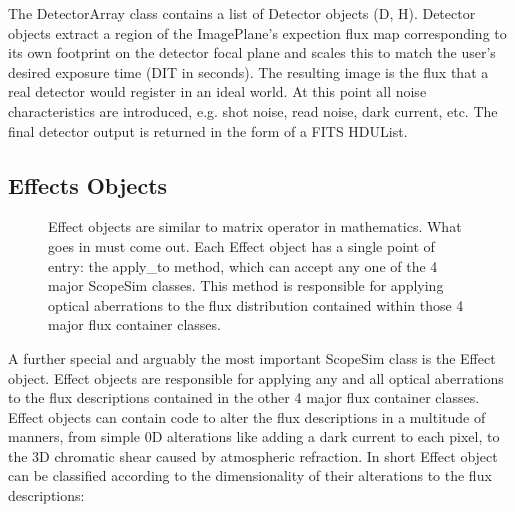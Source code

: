 The DetectorArray class contains a list of Detector objects (D, H).
Detector objects extract a region of the ImagePlane's expection flux map corresponding to its own footprint on the detector focal plane and scales this to match the user's desired exposure time (DIT in seconds).
The resulting image is the flux that a real detector would register in an ideal world.
At this point all noise characteristics are introduced, e.g. shot noise, read noise, dark current, etc.
The final detector output is returned in the form of a FITS HDUList.


\subsection{Effects Objects%
  \label{effects-objects}%
}

\begin{figure}[H]
\noindent{}\label{fig-effect}

\caption{Effect objects are similar to matrix operator in mathematics.
What goes in must come out.
Each Effect object has a single point of entry: the \textquotedbl{}apply\_to\textquotedbl{} method, which can accept any one of the 4 major ScopeSim classes.
This method is responsible for applying optical aberrations to the flux distribution contained within those 4 major flux container classes.}
\end{figure}

A further special and arguably the most important ScopeSim class is the Effect object.
Effect objects are responsible for applying any and all optical aberrations to the flux descriptions contained in the other 4 major flux container classes.
Effect objects can contain code to alter the flux descriptions in a multitude of manners, from simple 0D alterations like adding a dark current to each pixel, to the 3D chromatic shear caused by atmospheric refraction.
In short Effect object can be classified according to the dimensionality of their alterations to the flux descriptions:

